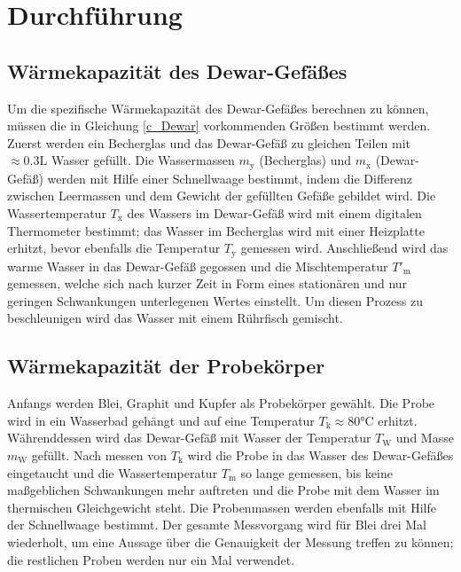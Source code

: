 \section{Durchf\"uhrung}
\label{sec:Durchfuehrung}
\subsection{W\"armekapazit\"at des Dewar-Gef\"aßes}

Um die spezifische Wärmekapazität des Dewar-Gefäßes berechnen zu können, müssen die in Gleichung \eqref{c_Dewar} vorkommenden Größen bestimmt werden.
Zuerst werden ein Becherglas und das Dewar-Gefäß zu gleichen Teilen mit $\approx0.3\si{\liter}$ Wasser gefüllt. Die Wassermassen $m_\mathup{y}$ (Becherglas) und $m_\mathup{x}$ (Dewar-Gefäß) werden mit Hilfe einer Schnellwaage bestimmt, indem die Differenz zwischen Leermassen und dem Gewicht der gefüllten Gefäße gebildet wird.
Die Wassertemperatur $T_\mathup{x}$ des Wassers im Dewar-Gefäß wird mit einem digitalen Thermometer bestimmt; das Wasser im Becherglas wird mit einer Heizplatte erhitzt, bevor ebenfalls die Temperatur $T_\mathup{y}$ gemessen wird. 
Anschließend wird das warme Wasser in das Dewar-Gefäß gegossen und die Mischtemperatur $T'_\mathup{m}$ gemessen, welche sich nach kurzer Zeit in Form eines stationären und nur geringen Schwankungen  unterlegenen Wertes einstellt.  Um diesen Prozess zu beschleunigen wird das Wasser mit einem Rührfisch gemischt.

\subsection{W\"armekapazit\"at der Probekörper}

Anfangs werden Blei, Graphit und Kupfer als Probekörper gewählt.
Die Probe wird in ein Wasserbad gehängt und auf eine Temperatur $T_\mathup{k}\approx80\si\celsius$ erhitzt. Währenddessen wird das Dewar-Gefäß mit Wasser der Temperatur $T_\mathup{W}$ und Masse $m_\mathup{W}$ gefüllt. Nach messen von $T_\mathup{k}$ wird die Probe in das Wasser des Dewar-Gefäßes eingetaucht und die Wassertemperatur $T_\mathup{m}$ so lange gemessen, bis keine maßgeblichen Schwankungen mehr auftreten und die Probe mit dem Wasser im thermischen Gleichgewicht steht.
Die Probenmassen werden ebenfalls mit Hilfe der Schnellwaage bestimmt.
Der gesamte Messvorgang wird für Blei drei Mal wiederholt, um eine Aussage über die Genauigkeit der Messung treffen zu können; die restlichen Proben werden nur ein Mal verwendet.
